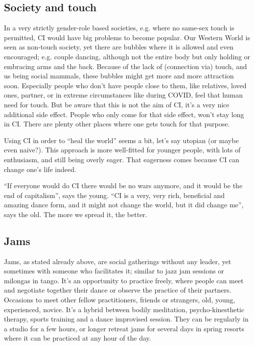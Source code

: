 \subsection{Society and touch}\label{subsec:society-and-touch}

In a very strictly gender-role based societies, e.g. where no same-sex touch is permitted, CI would have big problems to become popular.
Our Western World is seen as non-touch society, yet there are bubbles where it is allowed and even encouraged; e.g. couple dancing, although not the entire body but only holding or embracing arms and the back.
Because of the lack of (connection via) touch, and us being social mammals, these bubbles might get more and more attraction soon.
Especially people who don't have people close to them, like relatives, loved ones, partner, or in extreme circumstances like during COVID, feel that human need for touch.
But be aware that this is not the aim of CI, it's a very nice additional side effect.
People who only come for that side effect, won't stay long in CI.
There are plenty other places where one gets touch for that purpose.

Using CI in order to ``heal the world'' seems a bit, let's say utopian (or maybe even naive?).
This approach is more well-fitted for younger people, with lots of enthusiasm, and still being overly eager.
That eagerness comes because CI can change one's life indeed.

``If everyone would do CI there would be no wars anymore, and it would be the end of capitalism'', says the young.
``CI is a very, very rich, beneficial and amazing dance form, and it might not change the world, but it did change me'', says the old.
The more we spread it, the better.

\subsection{Jams}\label{subsec:jams}

Jams, as stated already above, are social gatherings without any leader, yet sometimes with someone who facilitates it; similar to jazz jam sessions or milongas in tango.
It's an opportunity to practice freely, where people can meet and negotiate together their dance or observe the practice of their partners.
Occasions to meet other fellow practitioners, friends or strangers, old, young, experienced, novice.
It's a hybrid between bodily meditation, psycho-kinesthetic therapy, sports training and a dance improvised session.
They can be regularly in a studio for a few hours, or longer retreat jams for several days in spring resorts where it can be practiced at any hour of the day.

